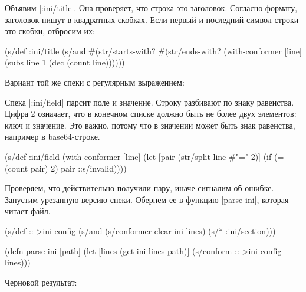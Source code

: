 Объявим \spverb|:ini/title|. Она проверяет, что строка это заголовок. Согласно
формату, заголовок пишут в квадратных скобках. Если первый и последний символ
строки это скобки, отбросим их:

\begin{english}
  \begin{clojure}
(s/def :ini/title
  (s/and
   #(str/starts-with? %
   #(str/ends-with? %
   (with-conformer [line]
     (subs line 1 (dec (count line))))))
  \end{clojure}
\end{english}

Вариант той же спеки с регулярным выражением:

\begin{english}
\end{english}

Спека \spverb|:ini/field| парсит поле и значение. Строку разбивают по знаку
равенства. Цифра 2 означает, что в конечном списке должно быть не более двух
элементов: ключ и значение. Это важно, потому что в значении может быть знак
равенства, например в base64-строке.

\begin{english}
  \begin{clojure}
(s/def :ini/field
  (with-conformer [line]
    (let [pair (str/split line #"=" 2)]
      (if (= (count pair) 2)
        pair
        ::s/invalid))))
  \end{clojure}
\end{english}

Проверяем, что действительно получили пару, иначе сигналим об ошибке. Запустим
урезанную версию спеки. Обернем ее в функцию \spverb|parse-ini|, которая читает
файл.

\begin{english}
  \begin{clojure}
(s/def ::->ini-config
  (s/and
   (s/conformer clear-ini-lines)
   (s/* :ini/section)))

(defn parse-ini [path]
  (let [lines (get-ini-lines path)]
    (s/conform ::->ini-config lines)))
  \end{clojure}
\end{english}

\noindent
Черновой результат:

